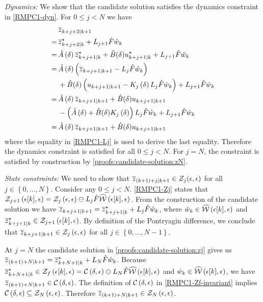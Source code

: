 \noindent\textit{Dynamics:}
%
We show that the candidate solution satisfies the dynamics constraint
in \eqref{RMPC1-dyn}. For $0\leq j<N$ we have
\begin{align*}
&\overline{z}_{k+j+2| k+1} \\
=\, & \overline{z}_{k+j+2| k}^{\star}+L_{j+1}\hat{F}\hat{w}_{k}\\
=\, &\hat{A}\left(\delta\right)\overline{z}_{k+j+1| k}^{\star}+\hat{B}(\delta)u_{k+j+1| k}^{\star}+L_{j+1}\hat{F}\hat{w}_{k}\\
=\, &\hat{A}\left(\delta\right)\left(\overline{z}_{k+j+1| k+1}-L_{j}\hat{F}\hat{w}_{k}\right) \\
&+\hat{B}(\delta)\left(u_{k+j+1| k+1}-K_{j}\left(\delta\right)L_{j}\hat{F}\hat{w}_{k}\right) +L_{j+1}\hat{F}\hat{w}_{k} \\
=\, &\hat{A}\left(\delta\right)\overline{z}_{k+j+1| k+1}+\hat{B}(\delta)u_{k+j+1| k+1} \\
&-\left(\hat{A}\left(\delta\right) + \hat{B}(\delta)K_{j}\left(\delta\right)\right)L_{j}\hat{F}\hat{w}_{k}+L_{j+1}\hat{F}\hat{w}_{k}\\
=\, &\hat{A}\left(\delta\right)\overline{z}_{k+j+1| k+1}+\hat{B}(\delta)u_{k+j+1| k+1}
\end{align*}
where the equality in \eqref{RMPC1-Lj} is used to derive the last
equality. %
Therefore the dynamics constraint
is satisfied for all $0\leq j<N$. For $j=N$, the constraint is satisfied
by construction by \eqref{proofs:candidate-solution:zN}.


\noindent\textit{State constraints:}
%
We need to show that $\overline{z}_{(k+1)+j| k+1}\in\mathcal{Z}_{j}\text{\ensuremath{\left(\epsilon,\epsilon\right)}}$
for all $j\in\left\{ 0,\dots,N\right\} $. Consider any $0\leq j<N$.
\eqref{RMPC1-Zj} states that $\mathcal{Z}_{j+1}\left(\epsilon[k],\epsilon\right)=\mathcal{Z}_{j}\left(\epsilon,\epsilon\right)\ominus L_{j}\hat{F}\widehat{\mathcal{W}}\left(\epsilon[k],\epsilon\right)$.
From the construction of the candidate solution we have $\overline{z}_{k+j+1| k+1}=\overline{z}_{k+j+1| k}^{\star}+L_{j}\hat{F}\hat{w}_{k}$,
where $\hat{w}_{k}\in\widehat{\mathcal{W}}\left(\epsilon[k],\epsilon\right)$ and $\overline{z}_{k+j+1| k}^{\star}\in\mathcal{Z}_{j+1}\left(\epsilon[k],\epsilon\right)$.
By definition of the Pontryagin difference, we conclude that $\overline{z}_{k+j+1| k+1}\in\mathcal{Z}_{j}\left(\epsilon,\epsilon\right)$
for all $j\in\left\{ 0,\dots,N-1\right\} $.

At $j=N$ the candidate solution in \eqref{proofs:candidate-solution:zj}
gives us $\overline{z}_{(k+1)+N| k+1}=\overline{z}_{k+N+1| k}^{\star}+L_{N}\hat{F}\hat{w}_{k}$.
Because $\overline{z}_{k+N+1| k}^{\star}\in\mathcal{Z}_{f}\left(\epsilon[k],\epsilon\right)=\mathcal{C}\left(\delta,\epsilon\right)\ominus L_{N}\hat{F}\widehat{\mathcal{W}}\left(\epsilon[k],\epsilon\right)$
and $\hat{w}_{k}\in\widehat{\mathcal{W}}\left(\epsilon[k],\epsilon\right)$, we have
$\overline{z}_{(k+1)+N| k+1}\in\mathcal{C}\left(\delta,\epsilon\right)$. The
definition of $\mathcal{C}\left(\delta,\epsilon\right)$ in \eqref{RMPC1-Zf-invariant}
implies $\mathcal{C}\left(\delta,\epsilon\right)\subseteq\mathcal{Z}_{N}\left(\epsilon,\epsilon\right)$.
Therefore $\overline{z}_{(k+1)+N| k+1}\in\mathcal{Z}_{N}\left(\epsilon,\epsilon\right)$.


